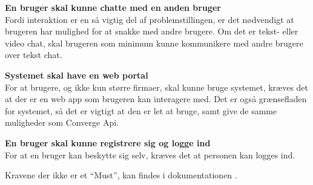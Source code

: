 \textbf{En bruger skal kunne chatte med en anden bruger} \\
Fordi interaktion er en så vigtig del af problemstillingen, er det nødvendigt at brugeren har mulighed for at snakke med andre brugere. Om det er tekst- eller video chat, skal brugeren som minimum kunne kommunikere med andre brugere over tekst chat.

\textbf{Systemet skal have en web portal} \\
For at brugere, og ikke kun større firmaer, skal kunne bruge systemet, kræves det at der er en web app som brugeren kan interagere med. Det er også grænsefladen for systemet, så det er vigtigt at den er let at bruge, samt give de samme muligheder som Converge Api.

\textbf{En bruger skal kunne registrere sig og logge ind} \\
For at en bruger kan beskytte sig selv, kræves det at personen kan logges ind.

Kravene der ikke er et “Must”, kan findes i dokumentationen \cite{doocumentation-kravspec}. 
